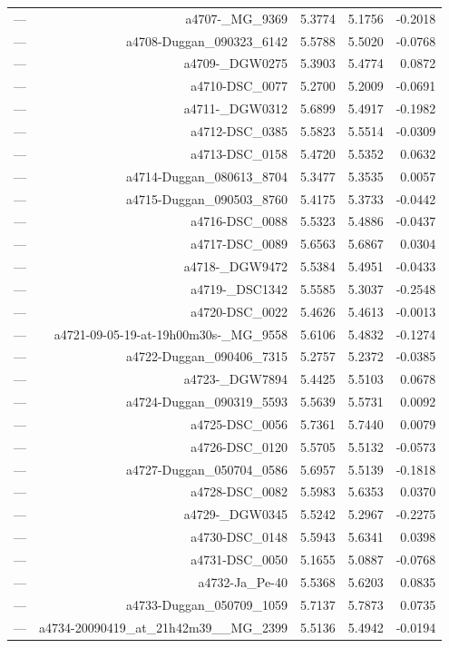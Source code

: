 \begin{table}[htbp]
\begin{tabular}{lrrrr}
— & a4707-_MG_9369 & 5.3774 & 5.1756 & -0.2018 \\
— & a4708-Duggan_090323_6142 & 5.5788 & 5.5020 & -0.0768 \\
— & a4709-_DGW0275 & 5.3903 & 5.4774 & 0.0872 \\
— & a4710-DSC_0077 & 5.2700 & 5.2009 & -0.0691 \\
— & a4711-_DGW0312 & 5.6899 & 5.4917 & -0.1982 \\
— & a4712-DSC_0385 & 5.5823 & 5.5514 & -0.0309 \\
— & a4713-DSC_0158 & 5.4720 & 5.5352 & 0.0632 \\
— & a4714-Duggan_080613_8704 & 5.3477 & 5.3535 & 0.0057 \\
— & a4715-Duggan_090503_8760 & 5.4175 & 5.3733 & -0.0442 \\
— & a4716-DSC_0088 & 5.5323 & 5.4886 & -0.0437 \\
— & a4717-DSC_0089 & 5.6563 & 5.6867 & 0.0304 \\
— & a4718-_DGW9472 & 5.5384 & 5.4951 & -0.0433 \\
— & a4719-_DSC1342 & 5.5585 & 5.3037 & -0.2548 \\
— & a4720-DSC_0022 & 5.4626 & 5.4613 & -0.0013 \\
— & a4721-09-05-19-at-19h00m30s-_MG_9558 & 5.6106 & 5.4832 & -0.1274 \\
— & a4722-Duggan_090406_7315 & 5.2757 & 5.2372 & -0.0385 \\
— & a4723-_DGW7894 & 5.4425 & 5.5103 & 0.0678 \\
— & a4724-Duggan_090319_5593 & 5.5639 & 5.5731 & 0.0092 \\
— & a4725-DSC_0056 & 5.7361 & 5.7440 & 0.0079 \\
— & a4726-DSC_0120 & 5.5705 & 5.5132 & -0.0573 \\
— & a4727-Duggan_050704_0586 & 5.6957 & 5.5139 & -0.1818 \\
— & a4728-DSC_0082 & 5.5983 & 5.6353 & 0.0370 \\
— & a4729-_DGW0345 & 5.5242 & 5.2967 & -0.2275 \\
— & a4730-DSC_0148 & 5.5943 & 5.6341 & 0.0398 \\
— & a4731-DSC_0050 & 5.1655 & 5.0887 & -0.0768 \\
— & a4732-Ja_Pe-40 & 5.5368 & 5.6203 & 0.0835 \\
— & a4733-Duggan_050709_1059 & 5.7137 & 5.7873 & 0.0735 \\
— & a4734-20090419_at_21h42m39__MG_2399 & 5.5136 & 5.4942 & -0.0194 \\

\end{tabular}
\end{table}

